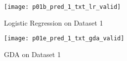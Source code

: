 \begin{answer}

\begin{figure}[h]
    \centering
    \texttt{[image: p01b\_pred\_1\_txt\_lr\_valid]}
    \caption{Logistic Regression on Dataset 1}
\end{figure}

\begin{figure}[h]
    \centering
    \texttt{[image: p01e\_pred\_1\_txt\_gda\_valid]}
    \caption{GDA on Dataset 1}
\end{figure}
\end{answer}
